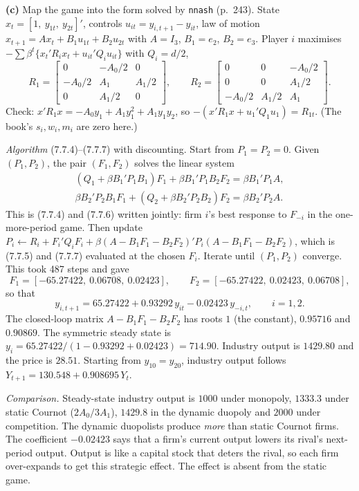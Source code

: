 \documentclass[12pt, letterpaper]{article}
\begin{document}
\begin{tcolorbox}[oddbox,title={Exercise 7.5 \quad Duopoly}]
\textbf{(c)} Map the game into the form solved by \texttt{nnash} (p.~243). State
$x_t=[1,\ y_{1t},\ y_{2t}]'$, controls $u_{it}=y_{i,t+1}-y_{it}$, law of motion
$x_{t+1}=Ax_t+B_1u_{1t}+B_2u_{2t}$ with $A=I_3$, $B_1=e_2$, $B_2=e_3$. Player $i$ maximises
$-\sum\beta^t\{x_t'R_ix_t+u_{it}'Q_iu_{it}\}$ with $Q_i=d/2$,
\[
R_1=\begin{bmatrix}0&-A_0/2&0\\-A_0/2&A_1&A_1/2\\0&A_1/2&0\end{bmatrix},\qquad
R_2=\begin{bmatrix}0&0&-A_0/2\\0&0&A_1/2\\-A_0/2&A_1/2&A_1\end{bmatrix}.
\]
Check: $x'R_1x=-A_0y_1+A_1y_1^2+A_1y_1y_2$, so $-(x'R_1x+u_1'Q_1u_1)=R_{1t}$. \checkmark{} (The book's
$s_i,w_i,m_i$ are zero here.)

\emph{Algorithm} (7.7.4)--(7.7.7) with discounting. Start from $P_1=P_2=0$. Given $(P_1,P_2)$, the
pair $(F_1,F_2)$ solves the linear system
\[
\begin{gathered}(Q_1+\beta B_1'P_1B_1)F_1+\beta B_1'P_1B_2F_2=\beta B_1'P_1A,\\
\beta B_2'P_2B_1F_1+(Q_2+\beta B_2'P_2B_2)F_2=\beta B_2'P_2A .\end{gathered}
\]
This is (7.7.4) and (7.7.6) written jointly: firm $i$'s best response to $F_{-i}$ in the
one-more-period game. Then update
$P_i\leftarrow R_i+F_i'Q_iF_i+\beta(A-B_1F_1-B_2F_2)'P_i(A-B_1F_1-B_2F_2)$, which is (7.7.5) and
(7.7.7) evaluated at the chosen $F_i$. Iterate until $(P_1,P_2)$ converge. This took 487 steps and gave
\[
F_1=[-65.27422,\ 0.06708,\ 0.02423],\qquad F_2=[-65.27422,\ 0.02423,\ 0.06708],
\]
so that
\[
\boxed{y_{i,t+1}=65.27422+0.93292\,y_{it}-0.02423\,y_{-i,t},\qquad i=1,2.}
\]
The closed-loop matrix $A-B_1F_1-B_2F_2$ has roots $1$ (the constant), $0.95716$ and $0.90869$. The
symmetric steady state is $y_i=65.27422/(1-0.93292+0.02423)=714.90$. Industry output is $1429.80$ and
the price is $28.51$. Starting from $y_{10}=y_{20}$, industry output follows
$Y_{t+1}=130.548+0.908695\,Y_t$.

\emph{Comparison.} Steady-state industry output is $1000$ under monopoly, $1333.3$ under static Cournot
($2A_0/3A_1$), $1429.8$ in the dynamic duopoly and $2000$ under competition. The dynamic duopolists
produce \emph{more} than static Cournot firms. The coefficient $-0.02423$ says that a firm's current
output lowers its rival's next-period output. Output is like a capital stock that deters the rival,
so each firm over-expands to get this strategic effect. The effect is absent from the static game.


\end{tcolorbox}
\end{document}
